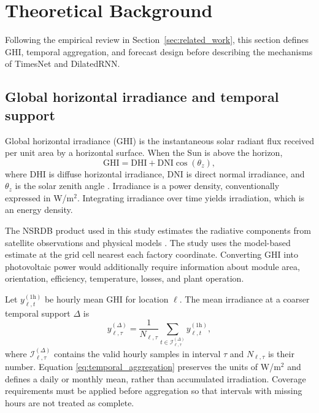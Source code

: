 \section{Theoretical Background}
\label{sec:background}

Following the empirical review in Section~\ref{sec:related_work}, this
section defines GHI, temporal aggregation, and forecast design before
describing the mechanisms of TimesNet and DilatedRNN.

\subsection{Global horizontal irradiance and temporal support}

Global horizontal irradiance (GHI) is the instantaneous solar radiant flux
received per unit area by a horizontal surface. When the Sun is above the horizon,
\begin{equation}
  \mathrm{GHI}
  =
  \mathrm{DHI}
  +
  \mathrm{DNI}\cos(\theta_z),
  \label{eq:ghi}
\end{equation}
where DHI is diffuse horizontal irradiance, DNI is direct normal irradiance,
and $\theta_z$ is the solar zenith angle \cite{duffie2013}. Irradiance is a
power density, conventionally expressed in W/m$^2$. Integrating irradiance
over time yields irradiation, which is an energy density.

The NSRDB product used in this study estimates the radiative components from
satellite observations and physical models \cite{sengupta2018}. The study
uses the model-based estimate at the grid cell nearest each factory
coordinate. Converting GHI into photovoltaic power would additionally
require information about module area, orientation, efficiency,
temperature, losses, and plant operation.

Let $y_{\ell,t}^{(1\mathrm{h})}$ be hourly mean GHI for location $\ell$. The
mean irradiance at a coarser temporal support $\Delta$ is
\begin{equation}
  y_{\ell,\tau}^{(\Delta)}
  =
  \frac{1}{N_{\ell,\tau}}
  \sum_{t\in\mathcal{I}_{\ell,\tau}^{(\Delta)}}
  y_{\ell,t}^{(1\mathrm{h})},
  \label{eq:temporal_aggregation}
\end{equation}
where $\mathcal{I}_{\ell,\tau}^{(\Delta)}$ contains the valid hourly samples in
interval $\tau$ and $N_{\ell,\tau}$ is their number. Equation
\eqref{eq:temporal_aggregation} preserves the units of W/m$^2$ and defines a
daily or monthly mean, rather than accumulated irradiation. Coverage
requirements must be applied before aggregation so that intervals with
missing hours are not treated as complete.

